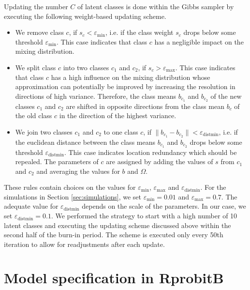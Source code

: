 \documentclass[article]{jss}
\newcommand{\eps}{\varepsilon}
\begin{document}
Updating the number $C$ of latent classes is done within the Gibbs sampler by executing the following weight-based updating scheme.
\begin{itemize}
	\item We remove class $c$, if $s_c<\eps_{\text{min}}$, i.e. if the class weight $s_c$ drops below some threshold $\eps_{\text{min}}$. This case indicates that class $c$ has a negligible impact on the mixing distribution.
	\item We split class $c$ into two classes $c_1$ and $c_2$, if $s_c>\eps_\text{max}$. This case indicates that class $c$ has a high influence on the mixing distribution whose approximation can potentially be improved by increasing the resolution in directions of high variance. Therefore, the class means $b_{c_1}$ and $b_{c_2}$ of the new classes $c_1$ and $c_2$ are shifted in opposite directions from the class mean $b_c$ of the old class $c$ in the direction of the highest variance.
	\item We join two classes $c_1$ and $c_2$ to one class $c$, if $\lVert b_{c_1} - b_{c_2} \rVert<\eps_{\text{distmin}}$, i.e. if the euclidean distance between the class means $b_{c_1}$ and $b_{c_2}$  drops below some threshold $\eps_{\text{distmin}}$. This case indicates location redundancy which should be repealed. The parameters of $c$ are assigned by adding the values of $s$ from $c_1$ and $c_2$ and averaging the values for $b$ and $\Omega$.
\end{itemize}
These rules contain choices on the values for $\eps_{\text{min}}$, $\eps_{\text{max}}$ and $\eps_{\text{distmin}}$. For the simulations in Section \ref{sec:simulations}, we set $\eps_{\text{min}}=0.01$ and $\eps_{\text{max}}=0.7$. The adequate value for $\eps_{\text{distmin}}$ depends on the scale of the parameters. In our case, we set $\eps_{\text{distmin}}=0.1$. We performed the strategy to start with a high number of 10 latent classes and executing the updating scheme discussed above within the second half of the burn-in period. The scheme is executed only every 50th iteration to allow for readjustments after each update.


\section{Model specification in RprobitB} \label{sec:specification}

\end{document}
